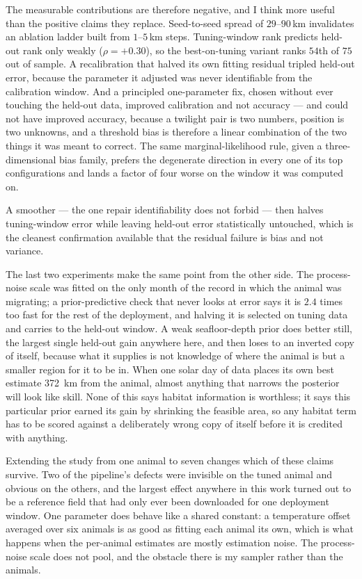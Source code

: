 \documentclass[conference]{IEEEtran}
\begin{document}
The measurable contributions are therefore negative, and I think more useful than
the positive claims they replace. Seed-to-seed spread of $29$--$90$\,\si{\km}
invalidates an ablation ladder built from $1$--$5$\,\si{\km} steps.
Tuning-window rank predicts held-out rank only weakly ($\rho=+0.30$), so the
best-on-tuning variant ranks $54$th of $75$ out of sample. A recalibration that
halved its own fitting residual tripled held-out error, because the parameter it
adjusted was never identifiable from the calibration window. And a principled
one-parameter fix, chosen without ever touching the held-out data, improved
calibration and not accuracy --- and could not have improved accuracy, because a
twilight pair is two numbers, position is two unknowns, and a threshold bias is
therefore a linear combination of the two things it was meant to correct. The
same marginal-likelihood rule, given a three-dimensional bias family, prefers the
degenerate direction in every one of its top configurations and lands a factor of
four worse on the window it was computed on.

A smoother --- the one repair identifiability does not forbid --- then halves
tuning-window error while leaving held-out error statistically untouched, which
is the cleanest confirmation available that the residual failure is bias and not
variance.

The last two experiments make the same point from the other side. The
process-noise scale was fitted on the only month of the record in which the
animal was migrating; a prior-predictive check that never looks at error says
it is $2.4$ times too fast for the rest of the deployment, and halving it is
selected on tuning data and carries to the held-out window. A weak
seafloor-depth prior does better still, the largest single held-out gain
anywhere here, and then loses to an inverted copy of itself, because what it
supplies is not knowledge of where the animal is but a smaller region for it to
be in. When one solar day of data places its own best estimate
\SI{372}{\km} from the animal, almost anything that narrows the posterior will
look like skill. None of this says habitat information is worthless; it says
this particular prior earned its gain by shrinking the feasible area, so any
habitat term has to be scored against a deliberately wrong copy of itself
before it is credited with anything.

Extending the study from one animal to seven changes which of these claims
survive. Two of the pipeline's defects were invisible on the tuned animal and
obvious on the others, and the largest effect anywhere in this work turned out
to be a reference field that had only ever been downloaded for one deployment
window. One parameter does behave like a shared constant: a temperature offset
averaged over six animals is as good as fitting each animal its own, which is
what happens when the per-animal estimates are mostly estimation noise. The
process-noise scale does not pool, and the obstacle there is my sampler rather
than the animals.
\end{document}

